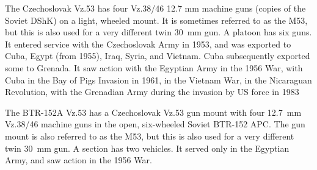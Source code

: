 \begin{withcounters}

    The Czechoslovak Vz.53 has four Vz.38/46 12.7 mm machine guns (copies of the Soviet DShK) on a light, wheeled mount.
    It is sometimes referred to as the M53, but this is also used for a very different twin 30~mm gun.
    A platoon has six guns.
    It entered service with the Czechoslovak Army in 1953, and was exported to Cuba, Egypt (from 1955), Iraq, Syria, and Vietnam. Cuba subsequently exported some to Grenada. It saw action with the Egyptian Army in the 1956 War, with Cuba in the Bay of Pigs Invasion in 1961, in the Vietnam War, in the Nicaraguan Revolution, with the Grenadian Army during the invasion by US force in 1983%


    The BTR-152A Vz.53 has a Czechoslovak Vz.53 gun mount with four 12.7~mm Vz.38/46 machine guns in the open, six-wheeled Soviet BTR-152 APC.
    The gun mount is also referred to as the M53, but this is also used for a very different twin 30~mm gun.
    A section has two vehicles.
    It served only in the Egyptian Army, and saw action in the 1956 War.%
\end{withcounters}
